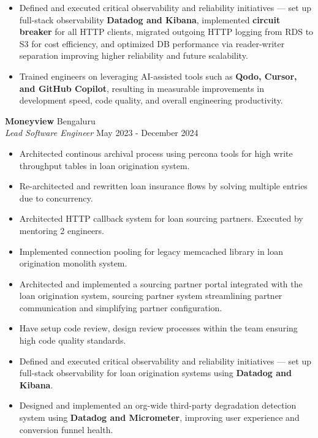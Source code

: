 \documentclass[10pt,a4paper]{article}
\begin{document}
\begin{itemize}
    \item Defined and executed critical observability and reliability initiatives — set up full-stack observability \textbf{Datadog and Kibana}, implemented \textbf{circuit breaker} for all HTTP clients, migrated outgoing HTTP logging from RDS to S3 for cost efficiency, and optimized DB performance via reader-writer separation improving higher reliability and future scalability.

    \item Trained engineers on leveraging AI-assisted tools such as \textbf{Qodo, Cursor, and GitHub Copilot}, resulting in measurable improvements in development speed, code quality, and overall engineering productivity.
\end{itemize}

\textbf{Moneyview} \hfill Bengaluru\\
\textit{Lead Software Engineer} \hfill May 2023 - December 2024\\
\vspace{-1mm}
\begin{itemize} \itemsep 1pt
    \item Architected continous archival process using percona tools for high write throughput tables in loan origination system.

    \item Re-architected and rewritten loan insurance flows by solving multiple entries due to concurrency.

    \item Architected HTTP callback system for loan sourcing partners. Executed by mentoring 2 engineers.

    \item Implemented connection pooling for legacy memcached library in loan origination monolith system.

    \item Architected and implemented a sourcing partner portal integrated with the loan origination system, sourcing partner system streamlining partner communication and simplifying partner configuration.

    \item Have setup code review, design review processes within the team ensuring high code quality standards.

    \item Defined and executed critical observability and reliability initiatives — set up full-stack observability for loan origination systems using \textbf{Datadog and Kibana}.

    \item Designed and implemented an org-wide third-party degradation detection system using \textbf{Datadog and Micrometer}, improving user experience and conversion funnel health.
\end{itemize}
\end{document}
